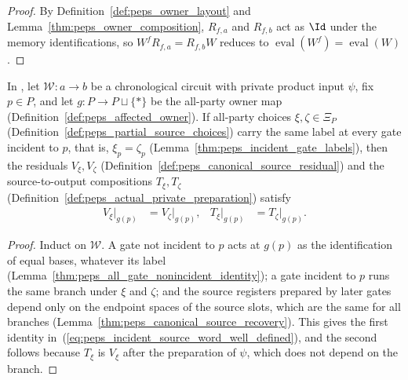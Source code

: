 \begin{proof}\leanok
    By Definition~\ref{def:peps_owner_layout} and
    Lemma~\ref{thm:peps_owner_composition}, $R_{f,a}$ and $R_{f,b}$ act as
    $\Id$ under the memory identifications, so $W^fR_{f,a}=R_{f,b}W$ reduces to
    $\operatorname{eval}(W^f)=\operatorname{eval}(W)$.
\end{proof}


\begin{lemma}
    \label{thm:peps_incident_source_word_well_defined}
    \leanok
    In \cite[proof of Theorem~5.2]{OpenAI2026PolynomialPEPS}, let
    $\mathcal W:a\to b$ be a chronological circuit with private product input
    $\psi$, fix $p\in P$, and let $g:P\to P\sqcup\{*\}$ be the all-party owner
    map (Definition~\ref{def:peps_affected_owner}). If all-party choices
    $\xi,\zeta\in\Xi_P$ (Definition~\ref{def:peps_partial_source_choices})
    carry the same label at every gate incident to $p$, that is, $\xi_p=\zeta_p$
    (Lemma~\ref{thm:peps_incident_gate_labels}), then the residuals
    $V_\xi,V_\zeta$ (Definition~\ref{def:peps_canonical_source_residual}) and
    the source-to-output compositions $T_\xi,T_\zeta$
    (Definition~\ref{def:peps_actual_private_preparation}) satisfy
    \begin{align}
        V_\xi|_{g(p)} & =V_\zeta|_{g(p)},
                      & T_\xi|_{g(p)}     & =T_\zeta|_{g(p)}.
        \label{eq:peps_incident_source_word_well_defined}
    \end{align}
\end{lemma}

\begin{proof}
    \leanok
    Induct on $\mathcal W$. A gate not incident to $p$ acts at $g(p)$ as the
    identification of equal bases, whatever its label
    (Lemma~\ref{thm:peps_all_gate_nonincident_identity}); a gate incident to
    $p$ runs the same branch under $\xi$ and $\zeta$; and the source registers
    prepared by later gates depend only on the endpoint spaces of the source
    slots, which are the same for all branches
    (Lemma~\ref{thm:peps_canonical_source_recovery}). This gives the first
    identity in~(\ref{eq:peps_incident_source_word_well_defined}), and the
    second follows because $T_\xi$ is $V_\xi$ after the preparation of $\psi$,
    which does not depend on the branch.
\end{proof}

